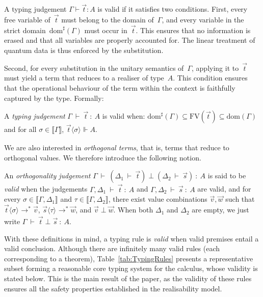 \documentclass[a4paper,UKenglish,numberwithinsect,pdfa,anonymous]{lipics-v2021}
\theoremstyle{restatestyle}
\newcommand\lra{\longrightarrow}
\newcommand\ansubst[2]{\ensuremath{\langle #1 \rangle_{#2}}}
\newcommand\dom[1]{\mathrm{dom}(#1)}
\newcommand\sdom[1]{\mathrm{dom}^{\sharp}(#1)}
\newcommand\FV[1]{\mathrm{FV}(#1)}
\def\eval{\lra^*}
\def\sem#1{\llbracket#1\rrbracket}
\def\TYP#1#2#3{#1~{\vdash}~#2~{:}~#3}
\def\SORTH#1#2#3#4{#1~{\vdash}~#2\perp#3~{:}~#4}
\def\ORTH#1#2#3#4#5#6{#1~{\vdash}~(#2~{\vdash}~#3)\perp(#4~{\vdash}~#5)~{:}~#6}
\def\real{\Vdash}
\begin{document}
A typing judgement $\Gamma\vdash \vec{t}:A$ is valid if it satisfies two
conditions.  First, every free variable of~$\vec{t}$ must belong to the domain
of~$\Gamma$, and every variable in the strict domain~$\sdom{\Gamma}$ must occur
in~$\vec{t}$.  This ensures that no information is erased and that all variables
are properly accounted for.  The linear treatment of quantum data is thus
enforced by the substitution.

Second, for every substitution in the unitary semantics of~$\Gamma$, applying
it to~$\vec{t}$ must yield a term that reduces to a realiser of type~$A$.  This
condition ensures that the operational behaviour of the term within the context
is faithfully captured by the type.  Formally:

\begin{definition}
  A \emph{typing judgement} $\TYP{\Gamma}{\vec{t}}{A}$ is valid when:
    $\sdom{\Gamma}\subseteq\FV{\vec{t}}\subseteq\dom{\Gamma}$
    and
    for all $\sigma\in\sem{\Gamma}$, 
          $\vec{t}\ansubst{\sigma}{}\real A$.
\end{definition}

We are also interested in \emph{orthogonal terms}, that is, terms that reduce
to orthogonal values. We therefore introduce the following notion.

\begin{definition}
  An \emph{orthogonality judgement}
  $\ORTH{\Gamma}{\Delta_1}{\vec{t}}{\Delta_2}{\vec{s}}{A}$
  is said to be \emph{valid} when the judgements
      $\TYP{\Gamma,\Delta_1}{\vec{t}}{A}$ and
      $\TYP{\Gamma,\Delta_2}{\vec{s}}{A}$ are valid, and
      for every
      $\sigma\in\sem{\Gamma,\Delta_1}$ and
      $\tau\in\sem{\Gamma,\Delta_2}$,
      there exist value combinations $\vec{v},\vec{w}$ such that
      $\vec{t}\ansubst{\sigma}{}\eval\vec{v}$,
      $\vec{s}\ansubst{\tau}{}\eval\vec{w}$,
      and $\vec{v}\perp\vec{w}$.
When both $\Delta_1$ and $\Delta_2$ are empty,
we just write $\SORTH{\Gamma}{\vec{t}}{\vec{s}}{A}$.
\end{definition}

With these definitions in mind, a typing rule is \emph{valid} when valid
premises entail a valid conclusion.  
Although there are infinitely many valid rules (each corresponding to a theorem),
Table~\ref{tab:TypingRules} presents a representative subset forming a reasonable
core typing system for the calculus, whose validity is stated below.
This is the main result of the paper, as the validity of these rules ensures all the safety properties established in the realisability model.
\end{document}
